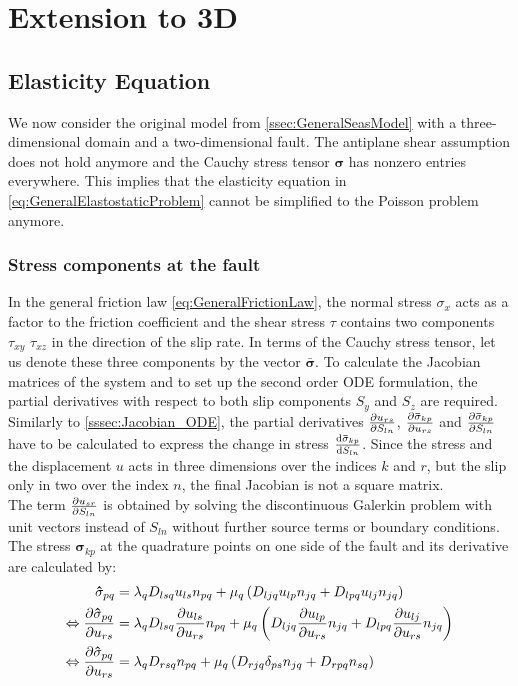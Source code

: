 \chapter{Extension to 3D}
\section{Elasticity Equation}
We now consider the original model from \autoref{ssec:GeneralSeasModel} with a three-dimensional domain and a two-dimensional fault. The antiplane shear assumption does not hold anymore and the Cauchy stress tensor $\mathbf{\sigma}$ has nonzero entries everywhere. This implies that the elasticity equation in \autoref{eq:GeneralElastostaticProblem} cannot be simplified to the Poisson problem anymore. \\

\subsection{Stress components at the fault}
In the general friction law \ref{eq:GeneralFrictionLaw}, the normal stress $\sigma_x$ acts as a factor to the friction coefficient and the shear stress $\tau$ contains two components $\tau_{xy}$ $\tau_{xz}$ in the direction of the slip rate. In terms of the Cauchy stress tensor, let us denote these three components by the vector $\mathbf{\bar{\sigma}}$. To calculate the Jacobian matrices of the system and to set up the second order ODE formulation, the partial derivatives with respect to both slip components $S_y$ and $S_z$ are required. Similarly to \autoref{sssec:Jacobian_ODE}, the partial derivatives $\pdv{u_{rs}}{S_{ln}}$, $\pdv{\mathbf{\bar{\sigma}}_{kp}}{u_{rs}}$ and $\pdv{\mathbf{\bar{\sigma}}_{kp}}{S_{ln}}$ have to be calculated to express the change in stress $\dv{\mathbf{\bar{\sigma}}_{kp}}{S_{ln}}$. Since the stress and the displacement $u$ acts in three dimensions over the indices $k$ and $r$, but the slip only in two over the index $n$, the final Jacobian is not a square matrix. \\
The term $\pdv{u_{sr}}{S_{ln}}$ is obtained by solving the discontinuous Galerkin problem with unit vectors instead of $S_{ln}$ without further source terms or boundary conditions. The stress $\mathbf{\hat{\sigma}}_{kp}$ at the quadrature points on one side of the fault and its derivative are calculated by:
\begin{align}
	\mathbf{\hat{\sigma}}_{pq} &= \lambda_q D_{lsq} u_{ls} n_{pq} + \mu_q \left(D_{ljq} u_{lp} n_{jq} + D_{lpq} u_{lj} n_{jq} \right) \\ \Leftrightarrow
	\pdv{\mathbf{\hat{\sigma}}_{pq}}{u_{rs}} &= \lambda_q D_{lsq} \pdv{u_{ls}}{u_{rs}} n_{pq} + \mu_q \left(D_{ljq} \pdv{u_{lp}}{u_{rs}} n_{jq} + D_{lpq} \pdv{u_{lj}}{u_{rs}} n_{jq} \right) \\ \Leftrightarrow
	\pdv{\mathbf{\hat{\sigma}}_{pq}}{u_{rs}} &= \lambda_q D_{rsq}  n_{pq} + \mu_q \left(D_{rjq} \delta_{ps} n_{jq} + D_{rpq} n_{sq} \right) \label{eq:intermediateStep7.3}
\end{align}
